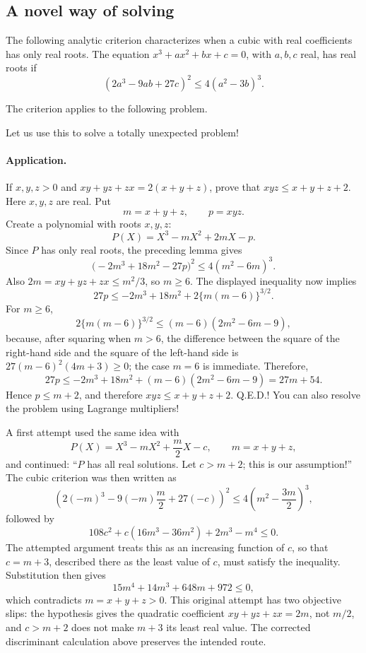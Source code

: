 \documentclass[11pt,a4paper]{article}
\begin{document}
\subsection{A novel way of solving}
\setcounter{theorem}{76}\begin{lemma}\label{lemma:lb1-79}
The following analytic criterion characterizes when a cubic with real
coefficients has only real roots.
The equation $x^3+ax^2+bx+c=0$, with $a,b,c$ real, has real roots if
\[(2a^3-9ab+27c)^2\leq4(a^2-3b)^3.\]
\end{lemma}
The criterion applies to the following problem.

Let us use this to solve a totally unexpected problem!
\paragraph{Application.}
If $x,y,z>0$ and $xy+yz+zx=2(x+y+z)$, prove that
$xyz\leq x+y+z+2$.
Here $x,y,z$ are real. Put
\[
m=x+y+z,\qquad p=xyz.
\]
Create a polynomial with roots $x,y,z$:
\[
P(X)=X^3-mX^2+2mX-p.
\]
Since $P$ has only real roots, the preceding lemma gives
\[
\bigl(-2m^3+18m^2-27p\bigr)^2
\leq4(m^2-6m)^3.
\]
Also $2m=xy+yz+zx\leq m^2/3$, so $m\geq6$. The displayed
inequality now implies
\[
27p\leq-2m^3+18m^2+2\{m(m-6)\}^{3/2}.
\]
For $m\geq6$,
\[
2\{m(m-6)\}^{3/2}
\leq(m-6)(2m^2-6m-9),
\]
because, after squaring when $m>6$, the difference between the square
of the right-hand side and the square of the left-hand side is
$27(m-6)^2(4m+3)\geq0$; the case $m=6$ is immediate. Therefore,
\[
27p\leq-2m^3+18m^2+(m-6)(2m^2-6m-9)=27m+54.
\]
Hence $p\leq m+2$, and therefore $xyz\leq x+y+z+2$. Q.E.D.!
You can also resolve the problem using Lagrange multipliers!

A first attempt used the same idea with
\[
P(X)=X^3-mX^2+\frac m2X-c,\qquad m=x+y+z,
\]
and continued: ``$P$ has all real solutions. Let $c>m+2$; this is our assumption!''
The cubic criterion was then written as
\[
\left(2(-m)^3-9(-m)\frac m2+27(-c)\right)^2
\leq4\left(m^2-\frac{3m}{2}\right)^3,
\]
followed by
\[
108c^2+c(16m^3-36m^2)+2m^3-m^4\leq0.
\]
The attempted argument treats this as an increasing function of $c$, so that $c=m+3$, described there as the least value of $c$, must satisfy the inequality. Substitution then gives
\[
15m^4+14m^3+648m+972\leq0,
\]
which contradicts $m=x+y+z>0$.
This original attempt has two objective slips: the hypothesis gives the quadratic coefficient $xy+yz+zx=2m$, not $m/2$, and $c>m+2$ does not make $m+3$ its least real value. The corrected discriminant calculation above preserves the intended route.
\end{document}
